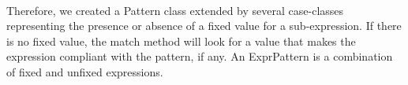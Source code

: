 \documentclass{report}
\begin{document}
\paragraph{}
\hspace{4mm}Therefore, we created a Pattern class extended by several case-classes representing the presence or absence of a fixed value
for a sub-expression. If there is no fixed value, the match method will look for a value that makes the expression compliant with the pattern, if any.
An ExprPattern is a combination of fixed and unfixed expressions.
\end{document}
